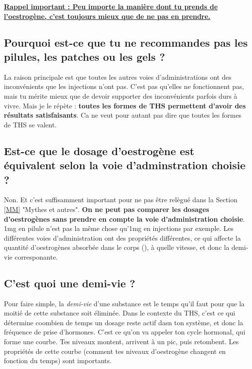 \documentclass{article}
\begin{document}
\noindent\underline{\textbf{Rappel important : Peu importe la manière dont tu prends de l'oestrogène, c'est toujours mieux que de ne pas en prendre.}}

\subsection{Pourquoi est-ce que tu ne recommandes pas les pilules, les patches ou les gels ?}

La raison principale est que toutes les autres voies d'administrations ont des inconvénients que les injections n'ont pas. C'est pas qu'elles ne fonctionnent pas, mais tu mérite mieux que de devoir supporter des inconvénients parfois durs à vivre. Mais je le répète : \textbf{toutes les formes de THS permettent d'avoir des résultats satisfaisants}. Ca ne veut pour autant pas dire que toutes les formes de THS se valent.

\subsection{Est-ce que le dosage d'oestrogène est équivalent selon la voie d'adminstration choisie ?}

Non. Et c'est suffisamment important pour ne pas être relègué dans la Section \ref{MM} "Mythes et autres". \textbf{On ne peut pas comparer les dosages d'oestrogènes sans prendre en compte la voie d'administration choisie}. 1mg en pilule n'est pas la même chose qu'1mg en injections par exemple. Les différentes voies d'administration ont des propriétés différentes, ce qui affecte la quantité d'oestrogènes absorbée dans le corps (), à quelle vitesse, et donc la demi-vie corresponante.

\subsection{C'est quoi une demi-vie ?}

Pour faire simple, la \textit{demi-vie} d'une substance est le temps qu'il faut pour que la moitié de cette substance soit éliminée. Dans le contexte du THS, c'est ce qui détermine coombien de temps un dosage reste actif dasn ton système, et donc la fréquence de prise d'hormones. C'est ce qu'on va appeler ton cycle hormonal, qui forme une courbe. Tes niveaux montent, arrivent à un pic, puis retombent. Les propriétés de cette courbe (comment tes niveaux d'oestrogène changent en fonction du temps) sont importants.
\end{document}
